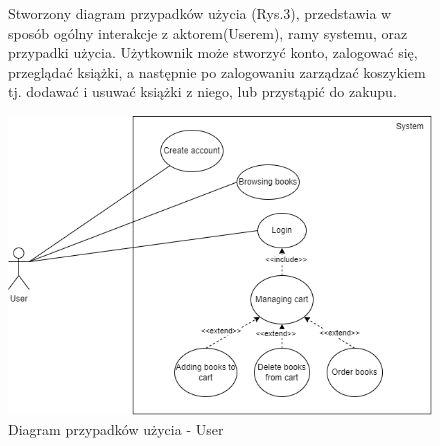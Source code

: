 \documentclass[]{article}
\begin{document}
\begin{figure}[ht]
	\begin{minipage}{\textwidth}
		\indent Stworzony diagram przypadków użycia (Rys.3), przedstawia w sposób ogólny interakcje z aktorem(Userem), ramy systemu, oraz przypadki użycia. Użytkownik może stworzyć konto, zalogować się, przeglądać książki, a następnie po zalogowaniu zarządzać koszykiem tj. dodawać i usuwać książki z niego, lub przystąpić do zakupu.
	\end{minipage}
	\vspace{15pt}
	
	\centering
	\includegraphics[scale=0.50]{przypadki_uzycia.png}
	\caption{Diagram przypadków użycia - User}
\end{figure}
\end{document}
